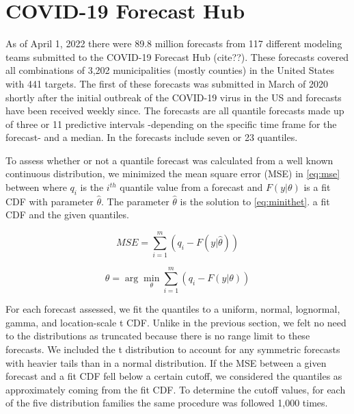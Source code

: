 \documentclass[11pt,notitlepage]{isuthesis}
\begin{document}
\section{COVID-19 Forecast Hub}

As of April 1, 2022 there were 89.8 million forecasts  
from 117 different modeling teams submitted to the COVID-19 Forecast Hub (cite??). 
These 
forecasts covered all combinations of 3,202 municipalities (mostly counties) 
in the United States with 441 targets. The first of these forecasts was 
submitted in March of 2020 shortly after the initial outbreak of the COVID-19 
virus in 
the US and forecasts have been received weekly since. 
The forecasts are all quantile forecasts made up of three or 11 predictive 
intervals -depending on the specific time frame for the forecast-
and a median. In the forecasts include seven or 23 quantiles.

To assess whether or not a quantile forecast was calculated from a well
known continuous distribution, we minimized the mean square error (MSE)  
in \eqref{eq:mse} between where $q_i$ is
the $i^{th}$ quantile value from a forecast and $F(y| \theta)$ is a fit CDF with 
parameter $\hat{\theta}$. The parameter $\hat{\theta}$ is the solution to 
\eqref{eq:minithet}.
a fit CDF and the given quantiles.

\begin{equation}
  MSE = \sum_{i=1}^m (q_i - F(y| \hat{\theta}))
  \label{eq:mse}
\end{equation}

\begin{equation}
  \hat{\theta} = \arg\min_{\theta} \sum_{i=1}^m (q_i - F(y| \theta))
  \label{eq:minthet}
\end{equation}




For each forecast assessed, we fit the quantiles to a uniform, normal, 
lognormal,
gamma, and location-scale t CDF. Unlike in the previous section, we felt no need
to the distributions as truncated because there is no range limit to these 
forecasts. We included the t distribution to account for any
symmetric forecasts with heavier tails than in a normal distribution.
If the MSE between a given forecast and a fit CDF fell below a certain cutoff,
we considered the quantiles as approximately coming from the fit CDF. To
determine the cutoff values, for each of the five distribution families the same
procedure was followed 1,000 times. 
\end{document}
